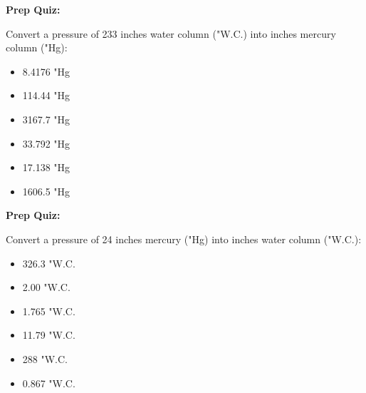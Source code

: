 \noindent
{\bf Prep Quiz:}

Convert a pressure of 233 inches water column ("W.C.) into inches mercury column ("Hg):

\begin{itemize}
\item{} 8.4176 "Hg
\vskip 5pt 
\item{} 114.44 "Hg
\vskip 5pt 
\item{} 3167.7 "Hg
\vskip 5pt 
\item{} 33.792 "Hg
\vskip 5pt 
\item{} 17.138 "Hg
\vskip 5pt 
\item{} 1606.5 "Hg
\end{itemize}



\vfil \eject

\noindent
{\bf Prep Quiz:}

Convert a pressure of 24 inches mercury ("Hg) into inches water column ("W.C.):

\begin{itemize}
\item{} 326.3 "W.C.
\vskip 5pt 
\item{} 2.00 "W.C.
\vskip 5pt 
\item{} 1.765 "W.C.
\vskip 5pt 
\item{} 11.79 "W.C.
\vskip 5pt 
\item{} 288 "W.C.
\vskip 5pt 
\item{} 0.867 "W.C.
\end{itemize}





